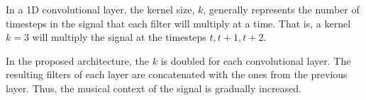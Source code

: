 
In a 1D convolutional layer, the kernel size, $k$, generally
represents the number of timesteps in the signal that each
filter will multiply at a time. That is, a kernel $k=3$ will
multiply the signal at the timesteps $t, t+1, t+2$.

In the proposed architecture, the $k$ is doubled for
each convolutional layer. The resulting filters of each
layer are concatenated with the ones from the previous
layer. Thus, the musical context of the signal is gradually
increased.
